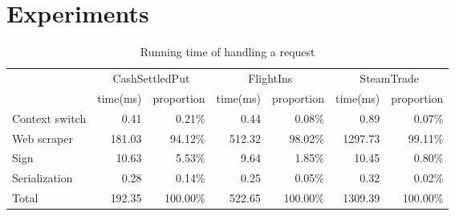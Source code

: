 \section{Experiments}
\label{sec:experiments}

\begin{table*}[ht]
\centering
\begin{tabular}{lrr|rr|rr}
\toprule
& \multicolumn{2}{c|}{\sf CashSettledPut} &
  \multicolumn{2}{c|}{\sf FlightIns} &
  \multicolumn{2}{c}{\sf SteamTrade} \\
  & time(ms) & proportion & time(ms) & proportion  & time(ms) & proportion\\
\midrule
Context switch & 0.41    & 0.21\%   & 0.44      & 0.08\%    & 0.89    & 0.07\%\\
Web scraper         & 181.03  & 94.12\%  & 512.32    & 98.02\%   & 1297.73 & 99.11\%\\
Sign                & 10.63   & 5.53\%   & 9.64      & 1.85\%    & 10.45   & 0.80\%\\
Serialization       & 0.28    & 0.14\%   & 0.25      & 0.05\%    & 0.32    & 0.02\%\\
\midrule
Total               & 192.35  & 100.00\%    & 522.65    & 100.00\% & 1309.39 & 100.00\%\\
\bottomrule
\end{tabular}
\caption{Running time of handling a request }
\label{tab:eval_profiling}
\end{table*}



%

